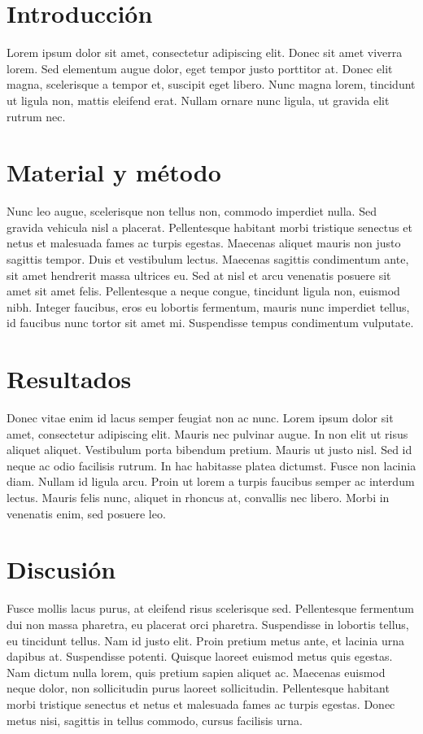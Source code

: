 \documentclass{article}
\begin{document}
	\begin{multicols}{2}
		\section{Introducción}
		Lorem ipsum dolor sit amet, consectetur adipiscing elit. Donec sit amet viverra lorem. Sed elementum augue dolor, eget tempor justo porttitor at. Donec elit magna, scelerisque a tempor et, suscipit eget libero. Nunc magna lorem, tincidunt ut ligula non, mattis eleifend erat. Nullam ornare nunc ligula, ut gravida elit rutrum nec. 
		
		\section{Material y método}
		Nunc leo augue, scelerisque non tellus non, commodo imperdiet nulla. Sed gravida vehicula nisl a placerat. Pellentesque habitant morbi tristique senectus et netus et malesuada fames ac turpis egestas. Maecenas aliquet mauris non justo sagittis tempor. Duis et vestibulum lectus. Maecenas sagittis condimentum ante, sit amet hendrerit massa ultrices eu. Sed at nisl et arcu venenatis posuere sit amet sit amet felis. Pellentesque a neque congue, tincidunt ligula non, euismod nibh. Integer faucibus, eros eu lobortis fermentum, mauris nunc imperdiet tellus, id faucibus nunc tortor sit amet mi. Suspendisse tempus condimentum vulputate.
		
		\section{Resultados}
		Donec vitae enim id lacus semper feugiat non ac nunc. Lorem ipsum dolor sit amet, consectetur adipiscing elit. Mauris nec pulvinar augue. In non elit ut risus aliquet aliquet. Vestibulum porta bibendum pretium. Mauris ut justo nisl. Sed id neque ac odio facilisis rutrum. In hac habitasse platea dictumst. Fusce non lacinia diam. Nullam id ligula arcu. Proin ut lorem a turpis faucibus semper ac interdum lectus. Mauris felis nunc, aliquet in rhoncus at, convallis nec libero. Morbi in venenatis enim, sed posuere leo.
		
		\section{Discusión}
		Fusce mollis lacus purus, at eleifend risus scelerisque sed. Pellentesque fermentum dui non massa pharetra, eu placerat orci pharetra. Suspendisse in lobortis tellus, eu tincidunt tellus. Nam id justo elit. Proin pretium metus ante, et lacinia urna dapibus at. Suspendisse potenti. Quisque laoreet euismod metus quis egestas. Nam dictum nulla lorem, quis pretium sapien aliquet ac. Maecenas euismod neque dolor, non sollicitudin purus laoreet sollicitudin. Pellentesque habitant morbi tristique senectus et netus et malesuada fames ac turpis egestas. Donec metus nisi, sagittis in tellus commodo, cursus facilisis urna.
		

\end{multicols}
\end{document}
